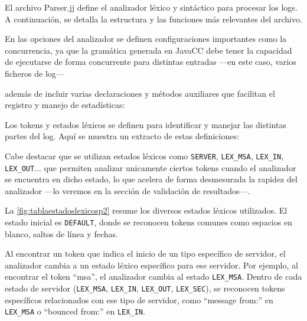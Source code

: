 El archivo Parser.jj define el analizador léxico y sintáctico para procesar los logs. A continuación, se detalla la estructura y las funciones más relevantes del archivo.

En las opciones del analizador se definen configuraciones importantes como la concurrencia, ya que la gramática generada en JavaCC debe tener la capacidad de ejecutarse de forma concurrente para distintas entradas ---en este caso, varios ficheros de log---

\lstset{inputencoding=utf8/latin1}


además de incluir varias declaraciones y métodos auxiliares que facilitan el registro y manejo de estadísticas:

\lstset{inputencoding=utf8/latin1}


Los tokens y estados léxicos se definen para identificar y manejar las distintas partes del log. Aquí se muestra un extracto de estas definiciones:

\lstset{inputencoding=utf8/latin1}


Cabe destacar que se utilizan estados léxicos como \lstinline|SERVER|, \lstinline|LEX_MSA|, \lstinline|LEX_IN|, \lstinline|LEX_OUT|... que permiten analizar unicamente ciertos tokens cuando el analizador se encuentra en dicho estado, lo que acelera de forma desmesurada la rapidez del analizador ---lo veremos en la sección de validación de resultados---.



La \autoref{fig:tablaestadoslexicosp2} resume los diversos estados léxicos utilizados. El estado inicial es \lstinline|DEFAULT|, donde se reconocen tokens comunes como espacios en blanco, saltos de línea y fechas.

Al encontrar un token que indica el inicio de un tipo específico de servidor, el analizador cambia a un estado léxico específico para ese servidor. Por ejemplo, al encontrar el token ``msa'', el analizador cambia al estado \lstinline|LEX_MSA|. Dentro de cada estado de servidor (\lstinline|LEX_MSA|, \lstinline|LEX_IN|, \lstinline|LEX_OUT|, \lstinline|LEX_SEC|), se reconocen tokens específicos relacionados con ese tipo de servidor, como ``message from:'' en \lstinline|LEX_MSA| o ``bounced from:'' en \lstinline|LEX_IN|.

